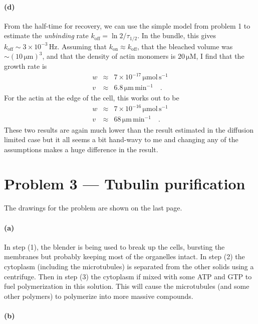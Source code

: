 \documentclass[12pt]{article}
\begin{document}
\paragraph{(d)}

From the half-time for recovery, we can use the simple model from problem 1 to
estimate the \emph{unbinding} rate $k_\mathrm{off} = \ln 2 / \tau_{1/2}$.
In the bundle, this gives $k_\mathrm{off} \sim 3\times 10^{-3} \,\mathrm{Hz}$.
Assuming that $k_\mathrm{on} \approx k_\mathrm{off}$, that the bleached
volume was $\sim (10\,\mathrm{\mu m})^3$, and that the density of actin
monomers is $20\,\mathrm{\mu M}$, I find that the growth rate is
\begin{eqnarray}
w &\approx& 7 \times 10^{-17} \, \mathrm{\mu mol \, s^{-1}} \\
v &\approx& 6.8 \, \mathrm{\mu m\,min^{-1}} \quad.
\end{eqnarray}
For the actin at the edge of the cell, this works out to be
\begin{eqnarray}
w &\approx& 7 \times 10^{-16} \, \mathrm{\mu mol \, s^{-1}} \\
v &\approx& 68 \, \mathrm{\mu m\,min^{-1}} \quad.
\end{eqnarray}
These two results are again much lower than the result estimated in the
diffusion limited case but it all seems a bit hand-wavy to me and changing any
of the assumptions makes a huge difference in the result.


\section{Problem 3 --- Tubulin purification}

The drawings for the problem are shown on the last page.

\paragraph{(a)}

In step (1), the blender is being used to break up the cells, bursting the
membranes but probably keeping most of the organelles intact.
In step (2) the cytoplasm (including the microtubules) is separated from the
other solids using a centrifuge.
Then in step (3) the cytoplasm if mixed with some ATP and GTP to fuel
polymerization in this solution.
This will cause the microtubules (and some other polymers) to polymerize into
more massive compounds.

\paragraph{(b)}
\end{document}
